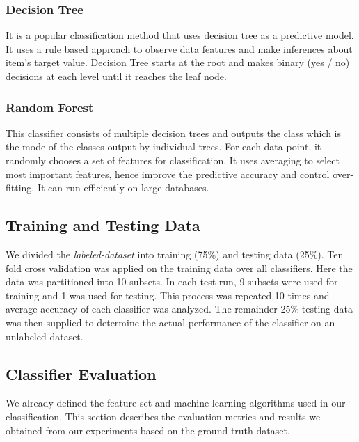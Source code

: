 \documentclass[conference]{IEEEtran}
\begin{document}
\subsubsection{Decision Tree} It is a popular classification method that uses decision tree as a predictive model. It uses a rule based approach to observe data features and make inferences about item's target value. Decision Tree starts at the root and makes binary (yes / no) decisions at each level until it reaches the leaf node.
\subsubsection{Random Forest} This classifier consists of multiple decision trees and outputs the class which is the mode of the classes output by individual trees. For each data point, it randomly chooses a set of features for classification. It uses averaging to select most important features, hence improve the predictive accuracy and control over-fitting. It can run efficiently on large databases. 
\subsection{Training and Testing Data}
\vspace{4pt}
We divided the \textit{labeled-dataset} into training (75\%) and testing data (25\%). Ten fold cross validation was applied on the training data over all classifiers. Here the data was partitioned into 10 subsets. In each test run, 9 subsets were used for training and 1 was used for testing. This process was repeated 10 times and average accuracy of each classifier was analyzed. The remainder 25\% testing data was then supplied to determine the actual performance of the classifier on an unlabeled dataset.


\subsection{Classifier Evaluation}\label{Classifier Evaluation}
\vspace{4pt}
We already defined the feature set and machine learning algorithms used in our classification. This section describes the evaluation metrics and results we obtained from our experiments based on the ground truth dataset.
\end{document}
